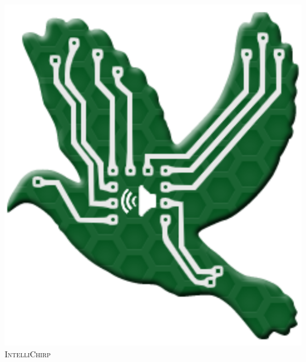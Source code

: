 \documentclass[12pt,journal,compsoc]{IEEEtran}
\begin{document}


\begin{center}
\vfill
\includegraphics[width=.1\textwidth]{images/logo.png}\\[0.5cm]
\textsc{\large IntelliChirp}
\end{center}

\end{document}

